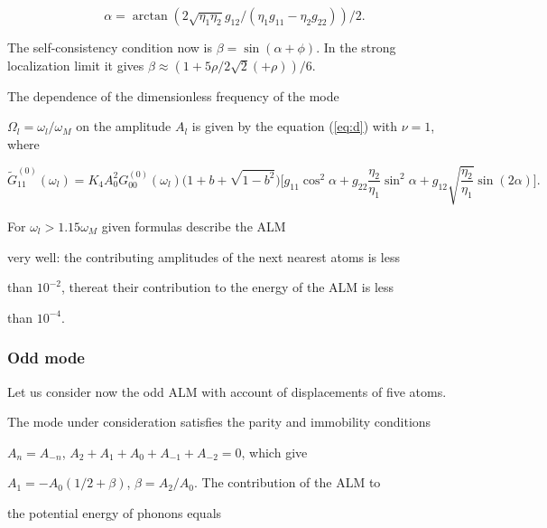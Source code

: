 \begin{equation}

\alpha=\arctan{( 2\sqrt{\eta_1 \eta_2} g_{12}

/(\eta_1 g_{11}-\eta_2 g_{22}))}/2.

\label{eq:f}

\end{equation}

The self-consistency condition now is 
$\beta = \sin{(\alpha +\phi)}$.
 In the strong localization limit it gives $\beta \approx (1+5\rho/2\sqrt{2}(+\rho))/6$.


The dependence of the dimensionless frequency of the mode 

$\Omega_l = \omega_l/\omega_M$ on the amplitude $A_l$ is given by 
the equation
 (\ref{eq:d}) with $\nu =1$, where

\begin{equation}
\tilde{G}^{(0)}_{11}(\omega_l)= K_4 A_0^2G^{(0)}_{00}(\omega_l) 

{\Big (}1+b + \sqrt{1-b^2}{\Big )}

{\Big [}g_{11}\cos^2{\alpha} + g_{22} \frac{\eta_2}{\eta_1}\sin^2{\alpha} + 

g_{12}\sqrt{\frac{\eta_2}{\eta_1}}\sin{(2\alpha)}{\Big ]}. 

\end{equation}

For $\omega_l > 1.15 \omega_M$ given formulas describe the ALM

very well: the contributing amplitudes of the next nearest atoms is less 

than $10^{-2}$, thereat their contribution to the energy of the ALM is less 

than $10^{-4}$. 



\subsubsection{Odd mode}

Let us consider now the odd ALM with account of displacements of five atoms. 

The mode under consideration satisfies the parity and immobility conditions 

$A_n=A_{-n}$, $A_2+A_1+A_0+A_{-1}+A_{-2}=0$, which give 

$A_1=-A_0 (1/2 + \beta)$, $\beta = A_2/A_0$. The contribution of the ALM to 

the potential energy of phonons equals 

